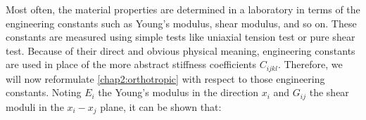 Most often, the material properties are determined in a laboratory in terms of the engineering constants such as Young's modulus, shear modulus, and so on. These constants are measured using simple tests like uniaxial tension test or pure shear test. Because of their direct and obvious physical meaning, engineering constants are used in place of the more abstract stiffness coefficients $C_{ijkl}$. Therefore, we will now reformulate \eqref{chap2:orthotropic} with respect to those engineering constants. Noting $E_i$ the Young's modulus in the direction $x_i$ and $G_{ij}$ the shear moduli in the $x_i-x_j$ plane, it can be shown that:
	

